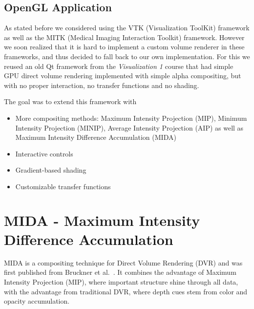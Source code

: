 
\subsection{OpenGL Application}

As stated before we considered using the VTK (Visualization ToolKit) framework as well as the MITK (Medical Imaging Interaction Toolkit) framework. However we soon realized that it is hard to implement a custom volume renderer in these frameworks, and thus decided to fall back to our own implementation. For this we reused an old Qt framework from the \emph{Visualization 1} course that had simple GPU direct volume rendering implemented with simple alpha compositing, but with no proper interaction, no transfer functions and no shading.

The goal was to extend this framework with
\begin{itemize}
	\item More compositing methods: Maximum Intensity Projection (MIP), Minimum Intensity Projection (MINIP), Average Intensity Projection (AIP) as well as Maximum Intensity Difference Accumulation (MIDA)
	\item Interactive controls
	\item Gradient-based shading
	\item Customizable transfer functions
\end{itemize}




\section{MIDA  - Maximum Intensity Difference Accumulation}

MIDA is a compositing technique for Direct Volume Rendering (DVR) and was first published from Bruckner et al.~\cite{bruckner2009instant}.
It combines the advantage of Maximum Intensity Projection (MIP), where important structure shine through all data, 
with the advantage from traditional DVR, where depth cues stem from color and opacity accumulation.

